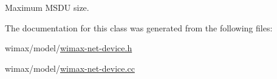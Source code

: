 Maximum M\+S\+DU size. 



The documentation for this class was generated from the following files\+:\begin{DoxyCompactItemize}
\item 
wimax/model/\hyperlink{wimax-net-device_8h}{wimax-\/net-\/device.\+h}\item 
wimax/model/\hyperlink{wimax-net-device_8cc}{wimax-\/net-\/device.\+cc}\end{DoxyCompactItemize}

